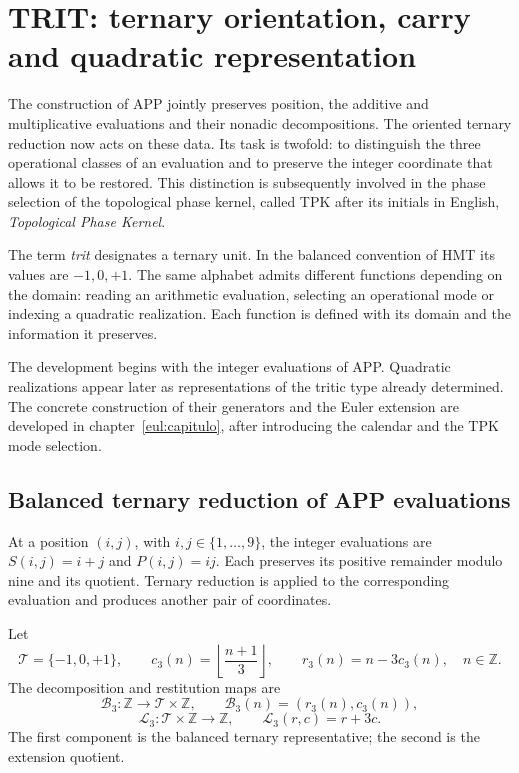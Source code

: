 \section{TRIT: ternary orientation, carry and quadratic representation}
\label{trit:capitulo}

The construction of APP jointly preserves position, the
additive and multiplicative evaluations and their nonadic decompositions. The oriented ternary reduction
now acts on these data. Its task is twofold: to distinguish
the three operational classes of an evaluation and to preserve the integer coordinate
that allows it to be restored. This distinction is subsequently involved in the phase
selection of the topological phase kernel, called TPK after its initials in
English, \emph{Topological Phase Kernel}.

The term \emph{trit} designates a ternary unit. In the balanced convention
of HMT its values are \(-1,0,+1\). The same alphabet admits different
functions depending on the domain: reading an arithmetic evaluation, selecting
an operational mode or indexing a quadratic realization. Each function
is defined with its domain and the information it preserves.

The development begins with the integer evaluations of APP. Quadratic
realizations appear later as representations of the tritic type already
determined. The concrete construction of their generators and the Euler
extension are developed in chapter~\ref{eul:capitulo}, after introducing
the calendar and the TPK mode selection.

\subsection{Balanced ternary reduction of APP evaluations}
\label{trit:reduccion}

At a position \((i,j)\), with \(i,j\in\{1,\ldots,9\}\), the integer
evaluations are \(S(i,j)=i+j\) and \(P(i,j)=ij\). Each preserves its positive
remainder modulo nine and its quotient. Ternary reduction is applied to the
corresponding evaluation and produces another pair of coordinates.

\begin{definicion}
\label{trit:def:balanceada}
Let
\[
 \mathcal T=\{-1,0,+1\},\qquad
 c_3(n)=\left\lfloor\frac{n+1}{3}\right\rfloor,\qquad
 r_3(n)=n-3c_3(n),\quad n\in\mathbb Z.
\]
The decomposition and restitution maps are
\[
 \mathcal B_3:\mathbb Z\longrightarrow\mathcal T\times\mathbb Z,
 \qquad \mathcal B_3(n)=(r_3(n),c_3(n)),
\]
\[
 \mathcal L_3:\mathcal T\times\mathbb Z\longrightarrow\mathbb Z,
 \qquad \mathcal L_3(r,c)=r+3c.
\]
The first component is the balanced ternary representative; the second
is the extension quotient.
\end{definicion}

